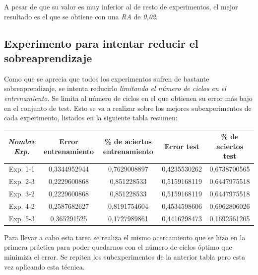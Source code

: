 \documentclass{uc3mpracticas}
\begin{document}
\vspace{1mm}

A pesar de que su valor es muy inferior al de resto de experimentos, el mejor resultado es el que se obtiene con una \textit{RA} de \textit{0,02}.



\subsection{Experimento para intentar reducir el sobreaprendizaje}

Como que se aprecia que todos los experimentos sufren de bastante sobreaprendizaje, se intenta reducirlo \textit{limitando el número de ciclos en el entrenamiento}. Se limita al número de ciclos en el que obtienen su error más bajo en el conjunto de test. Esto se va a realizar sobre los mejores subexperimentos de cada experimento, listados en la siguiente tabla resumen:

\begin{center}
  \begin{tabular}{|c|c|c|c|c|}
    \hline
        \textit{\textbf{Nombre Exp.}}     & \textbf{Error entrenamiento} & \textbf{\% de aciertos entrenamiento} & \textbf{Error test} & \textbf{\% de aciertos test}\\ \hline
        Exp. 1-1         &  0,3344952944       &  0,7629008897                &  0,4235530262   &  0,6738700565     \\ \hline
        Exp. 2-3         &  0,2229600868       &  0,851228533                 &  0,5159168119   &  0,6447975518     \\ \hline
        Exp. 3-2         &  0,2229600868       &  0,851228533                 &  0,5159168119   &  0,6447975518     \\ \hline
        Exp. 4-2         &  0,2587682627       &  0,8191754604                &  0,4534598606   &  0,6962806026     \\ \hline
        Exp. 5-3         &  0,365291525        &  0,1727989861                &  0,4416298473   &  0,1692561205     \\ \hline
  \end{tabular}
\end{center}


Para llevar a cabo esta tarea se realiza el mismo acercamiento que se hizo en la primera práctica para poder quedarnos con el número de ciclos óptimo que minimiza el error. Se repiten los subexperimentos de la anterior tabla pero esta vez aplicando esta técnica.
\end{document}
